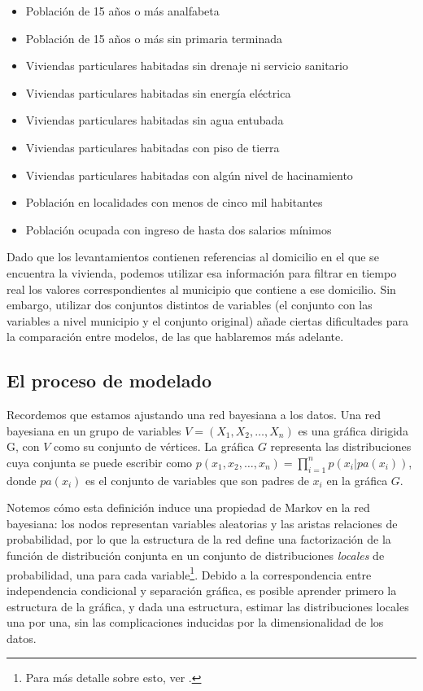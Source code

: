 \begin{itemize}
    \item Población de 15 años o más analfabeta
    \item Población de 15 años o más sin primaria terminada
    \item Viviendas particulares habitadas sin drenaje ni servicio sanitario
    \item Viviendas particulares habitadas sin energía eléctrica
    \item Viviendas particulares habitadas sin agua entubada
    \item Viviendas particulares habitadas con piso de tierra
    \item Viviendas particulares habitadas con algún nivel de hacinamiento
    \item Población en localidades con menos de cinco mil habitantes
    \item Población ocupada con ingreso de hasta dos salarios mínimos
\end{itemize}
Dado que los levantamientos contienen referencias al domicilio en el que se encuentra la vivienda, podemos utilizar esa información para filtrar en tiempo real los valores correspondientes al municipio que contiene a ese domicilio. Sin embargo, utilizar dos conjuntos distintos de variables (el conjunto con las variables a nivel municipio y el conjunto original) añade ciertas dificultades para la comparación entre modelos, de las que hablaremos más adelante.
\subsection*{El proceso de modelado}
Recordemos que estamos ajustando una red bayesiana a los datos. Una red bayesiana en un grupo de variables $V = (X_1, X_2, \dots, X_n)$ es una gráfica dirigida G, con $V$ como su conjunto de vértices. La gráfica $G$ representa las distribuciones cuya conjunta se puede escribir como $p(x_1, x_2, \dots, x_n) = \prod_{i=1}^{n}p(x_i|pa(x_i))$, donde $pa(x_i)$ es el conjunto de variables que son padres de $x_i$ en la gráfica $G$.
\par
\noindent
Notemos cómo esta definición induce una propiedad de Markov en la red bayesiana: los nodos representan variables aleatorias y las aristas relaciones de probabilidad, por lo que la estructura de la red define una factorización de la función de distribución conjunta en un conjunto de distribuciones \textit{locales} de probabilidad, una para cada variable\footnote{Para más detalle sobre esto, ver \cite{bayesian_networks}.}. Debido a la correspondencia entre independencia condicional y separación gráfica, es posible aprender primero la estructura de la gráfica, y dada una estructura, estimar las distribuciones locales una por una, sin las complicaciones inducidas por la dimensionalidad de los datos.
